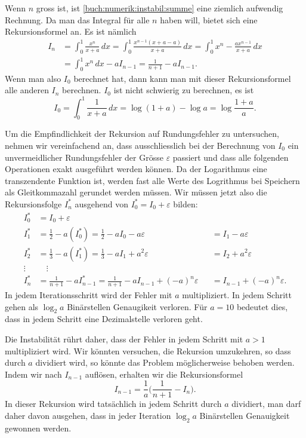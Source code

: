 Wenn $n$ gross ist, ist \eqref{buch:numerik:instabil:summe}
eine ziemlich aufwendig Rechnung.
Da man das Integral für alle $n$ haben will, bietet sich eine
Rekursionsformel an.
%
Es ist nämlich
\begin{align*}
I_n
&=
\int_0^1 \frac{x^n}{x+a}\,dx
=
\int_0^1 \frac{x^{n-1}(x+a-a)}{x+a}\,dx
=
\int_0^1 x^n - \frac{ax^{n-1}}{x+a}\,dx
\\
&=
\int_0^1 x^n\,dx - aI_{n-1}
=
\frac1{n+1} - a I_{n-1}.
\end{align*}
Wenn man also $I_0$ berechnet hat, dann kann man mit dieser 
Rekursionsformel alle anderen $I_n$ berechnen.
$I_0$ ist nicht schwierig zu berechnen, es ist
\[
I_0 = \int_0^1 \frac{1}{x+a}\,dx = \log(1+a) - \log a = \log\frac{1+a}a.
\]

Um die Empfindlichkeit der Rekursion auf Rundungsfehler zu untersuchen,
nehmen wir vereinfachend an, dass ausschliesslich bei der Berechnung von
$I_0$ ein unvermeidlicher Rundungsfehler der Grösse $\varepsilon$ passiert
und dass alle folgenden Operationen exakt ausgeführt werden können.
Da der Logarithmus eine transzendente Funktion ist, werden fast alle Werte
des Logrithmus bei Speichern als Gleitkommazahl gerundet werden müssen.
%
Wir müssen jetzt also die Rekursionsfolge $I^*_n$ ausgehend von
$I_0^* = I_0+\varepsilon$
bilden:
\[
\begin{aligned}
I_0^* &= I_0 + \varepsilon
\\
I_1^* &= \frac12 - a(I_0^*) = \frac12-aI_0 - a\varepsilon
      &&=I_1 - a \varepsilon
\\
I_2^* &= \frac13 - a(I_1^*) = \frac13-aI_1 + a^2\varepsilon
      &&=I_2 + a^2 \varepsilon
\\
\vdots\;&\quad\vdots\\
I_n^* &= \frac{1}{n+1} -aI_{n-1}^* = \frac{1}{n+1} - aI_{n-1} + (-a)^n\varepsilon
      &&= I_{n-1} + (-a)^n\varepsilon.
\end{aligned}
\]
In jedem Iterationsschritt wird der Fehler mit $a$ multipliziert.
In jedem Schritt gehen als $\log_2a$ Binärstellen Genaugikeit verloren.
Für $a=10$ bedeutet dies, dass in jedem Schritt eine Dezimalstelle
verloren geht.

Die Instabilität rührt daher, dass der Fehler in jedem Schritt mit
$a>1$ multipliziert wird.
Wir könnten versuchen, die Rekursion umzukehren, so dass durch $a$ 
dividiert wird, so könnte das Problem möglicherweise behoben werden.
Indem wir nach $I_{n-1}$ auflösen, erhalten wir die Rekursionsformel
\[
I_{n-1} = \frac1{a} \biggl(
\frac{1}{n+1} -I_n\biggr).
\]
%
In dieser Rekursion wird tatsächlich in jedem Schritt durch $a$ dividiert,
man darf daher davon ausgehen, dass in jeder Iteration 
$\log_2a$ Binärstellen Genauigkeit gewonnen werden.

